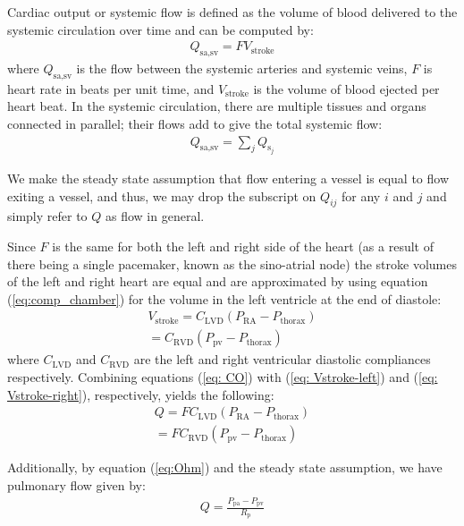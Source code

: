 \documentclass[12pt]{article}
\begin{document}
Cardiac output or systemic flow is defined as the volume of blood delivered to the systemic circulation over time and can be computed by: 
\begin{align}
    Q_\text{sa,sv} = FV_{\text{stroke}} \label{eq: CO}
\end{align}
where $Q_\text{sa,sv}$ is the flow between the systemic arteries and systemic veins, $F$ is heart rate in beats per unit time, and $V_{\text{stroke}}$ is the volume of blood ejected per heart beat. In the systemic circulation, there are multiple tissues and organs connected in parallel; their flows add to give the total systemic flow:
\begin{align}
    Q_\text{sa,sv} = \sum_j Q_{\text{s}_j} \label{eq:sum}
\end{align}

We make the steady state assumption that flow entering a vessel is equal to flow exiting a vessel, and thus, we may drop the subscript on $Q_{ij}$ for any $i$ and $j$ and simply refer to $Q$ as flow in general. 

Since $F$ is the same for both the left and right side of the heart (as a result of there being a single pacemaker, known as the sino-atrial node) the stroke volumes of the left and right heart are equal and are approximated by using equation (\ref{eq:comp_chamber}) for the volume in the left ventricle at the end of diastole: 
\begin{align}
    V_\text{stroke} = C_\text{LVD}(P_\text{RA}-P_\text{thorax})\label{eq: Vstroke-left}\\= C_\text{RVD}(P_\text{pv}-P_\text{thorax}) \label{eq: Vstroke-right} 
\end{align}
where $C_\text{LVD}$ and $C_\text{RVD}$ are the left and right ventricular diastolic compliances respectively. Combining equations (\ref{eq: CO}) with (\ref{eq: Vstroke-left}) and (\ref{eq: Vstroke-right}), respectively, yields the following: 
\begin{align}
    Q = FC_\text{LVD}(P_\text{RA}-P_\text{thorax}) \label{eq: Q}\\ 
      = FC_\text{RVD}(P_\text{pv}-P_\text{thorax}) \label{eq: heart rate}
\end{align}

Additionally, by equation (\ref{eq:Ohm}) and the steady state assumption, we have pulmonary flow given by:
\begin{align}
    Q = \frac{P_\text{pa}-P_\text{pv}}{R_\text{p}} \label{eq:pulmflow}
\end{align}
\end{document}
